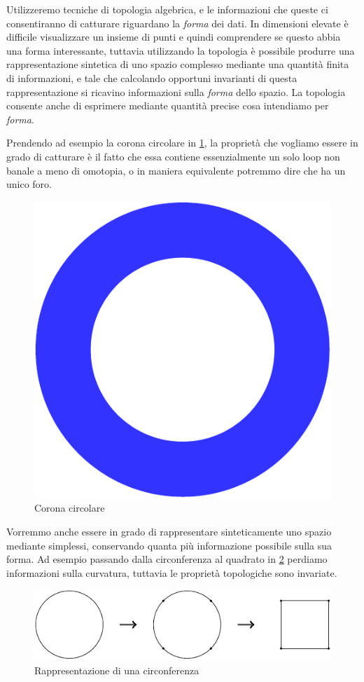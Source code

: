 Utilizzeremo tecniche di topologia algebrica, e le informazioni che queste ci consentiranno di catturare riguardano la \emph{forma} dei dati. In dimensioni elevate è difficile visualizzare un insieme di punti e quindi comprendere se questo abbia una forma interessante, tuttavia utilizzando la topologia è possibile produrre una rappresentazione sintetica di uno spazio complesso mediante una quantità finita di informazioni, e tale che calcolando opportuni invarianti di questa rappresentazione si ricavino informazioni sulla \emph{forma} dello spazio. La topologia consente anche di esprimere mediante quantità precise cosa intendiamo per \emph{forma}.

Prendendo ad esempio la corona circolare in \cref{fig:annulus}, la proprietà che vogliamo essere in grado di catturare è il fatto che essa contiene essenzialmente un solo loop non banale a meno di omotopia, o in maniera equivalente potremmo dire che ha un unico foro.

\begin{figure}[ht]
  \begin{center}
    \includegraphics[width=.5\textwidth]{gfx/annulus.pdf}
    \caption{Corona circolare}  \label{fig:annulus}
  \end{center}
\end{figure}

Vorremmo anche essere in grado di rappresentare sinteticamente uno spazio mediante simplessi, conservando quanta più informazione possibile sulla sua forma. Ad esempio passando dalla circonferenza al quadrato in \cref{fig:circsquare} perdiamo informazioni sulla curvatura, tuttavia le proprietà topologiche sono invariate.

\begin{figure}[ht]
  \begin{center}
    \includegraphics[width=.7\textwidth]{gfx/circsquare.pdf}
    \caption{Rappresentazione di una circonferenza}  \label{fig:circsquare}
  \end{center}
\end{figure}

